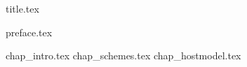 \documentclass[12pt,letterpaper,oneside]{scrbook}
\begin{document}
\frontmatter
{title.tex}
 
\tableofcontents

{preface.tex}

\mainmatter

{chap_intro.tex}
{chap_schemes.tex}
{chap_hostmodel.tex}

\appendix

\renewcommand{\thechapter}{\Alph{chapter}}

\backmatter
\end{document}
